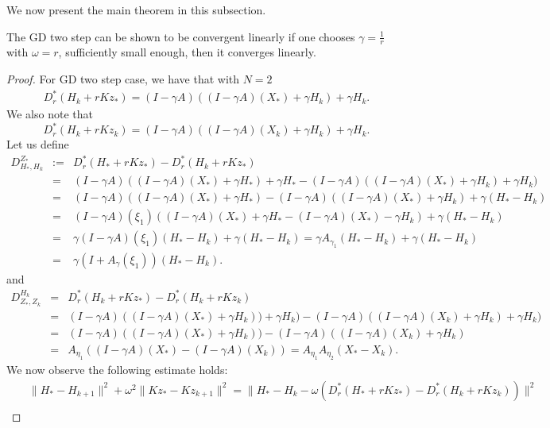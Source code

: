 We now present the main theorem in this subsection. 
\begin{lemma} 
The GD two step can be shown to be convergent linearly if one chooses $\gamma = \frac{1}{r}$ with $\omega = r$, sufficiently small enough, then it converges linearly.
\end{lemma} 
\begin{proof} 
For GD two step case, we have that with $N = 2$
\begin{eqnarray*}
D_r^*(H_k + rKz_*) = (I - \gamma A)((I - \gamma A)(X_*) + \gamma H_k) + \gamma H_k.  
\end{eqnarray*}
We also note that  
\begin{equation*}
D_r^*(H_k + rKz_k) = (I - \gamma A)((I - \gamma A)(X_k) + \gamma H_k) + \gamma H_k.  
\end{equation*}
Let us define 
\begin{eqnarray*}
D_{H_*,H_k}^{Z_*} &:=& D_r^{*} (H_* + rK z_*) - D_r^*(H_k + rKz_*) \\
&=& (I - \gamma A)((I - \gamma A)(X_*) + \gamma H_*) + \gamma H_* - (I - \gamma A)((I - \gamma A)(X_*) + \gamma H_k) + \gamma H_k)  \\
&=& (I - \gamma A)((I - \gamma A)(X_*) + \gamma H_*) - (I - \gamma A)((I - \gamma A)(X_*) + \gamma H_k) + \gamma (H_* - H_k) \\ 
&=& (I - \gamma A)(\xi_1) ( (I - \gamma A)(X_*) + \gamma H_* - (I - \gamma A)(X_*) - \gamma H_k ) + \gamma (H_* - H_k) \\ 
&=& \gamma (I - \gamma A)(\xi_1)(H_* - H_k) + \gamma (H_* - H_k) = \gamma A_{\gamma_1} (H_* - H_k) + \gamma (H_* - H_k) \\
&=& \gamma (I +  A_\gamma(\xi_1)) (H_* - H_k). 
\end{eqnarray*}
and 
\begin{eqnarray*}
D_{Z_*,Z_k}^{H_k} &=& D_r^*(H_k + rKz_*) - D_r^*(H_k + rKz_k) \\
&=& (I - \gamma A)((I - \gamma A)(X_*) + \gamma H_k)) + \gamma H_k) - (I - \gamma A)((I - \gamma A)(X_k) + \gamma H_k) + \gamma H_k) \\ 
&=& (I - \gamma A)((I - \gamma A)(X_*) + \gamma H_k)) - (I - \gamma A)((I - \gamma A)(X_k) + \gamma H_k) \\ 
&=& A_{\eta_1} ((I - \gamma A)(X_*) - (I - \gamma A)(X_k)) = A_{\eta_1} A_{\eta_2} (X_*  - X_k). 
\end{eqnarray*}
We now observe the following estimate holds: 
\begin{eqnarray*}
&& \|H_* - H_{k+1}\|^2 + \omega^2 \|Kz_{*} - Kz_{k+1}\|^2 = \|H_* - H_k - \omega (D_r^{*} (H_* + r K z_*) - D_r^{*} (H_k + r K z_k))\|^2 \\ 

\end{eqnarray*}
\end{proof}
